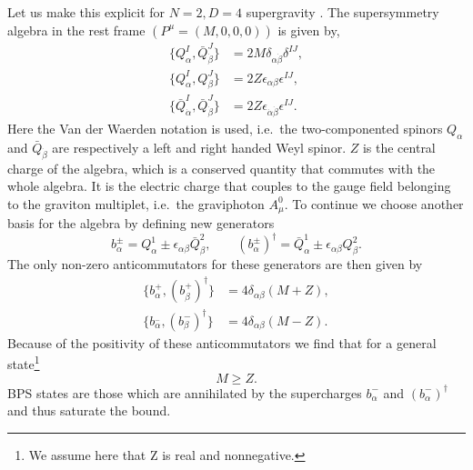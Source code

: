 \documentclass[12pt,twoside]{book}
\begin{document}
Let us make this explicit for $N=2, D=4$ supergravity \cite{string-bbs}. The supersymmetry algebra in the rest frame $( P^{\mu} = (M,0,0,0) )$ is given by,
\begin{equation}\label{N2D4-restAlg}
\begin{split}
\{ Q_{\alpha}^{I}, \bar{Q}_{\dot{\beta}}^{J} \} & = 2M\delta_{\alpha\dot{\beta}} \delta^{IJ},\\
\{ Q_{\alpha}^{I}, Q_{\beta}^{J} \} & = 2Z\epsilon_{\alpha\beta} \epsilon^{IJ},\\
\{ \bar{Q}_{\dot{\alpha}}^{I}, \bar{Q}_{\dot{\beta}}^{J} \}& = 2Z\epsilon_{\dot{\alpha}\dot{\beta}} \epsilon^{IJ}.
\end{split}
\end{equation}
Here the Van der Waerden notation is used, i.e.\ the two-componented spinors $Q_{\alpha}$ and $\bar{Q}_{\dot{\beta}}$ are respectively a left and right handed Weyl spinor. $Z$ is the central charge of the algebra, which is a conserved quantity that commutes with the whole algebra. It is the electric charge that couples to the gauge field belonging to the graviton multiplet, i.e.\ the graviphoton $A_{\mu}^{0}$.
To continue we choose another basis for the algebra by defining new generators
\begin{equation}
b_{\alpha}^{\pm} = Q_{\alpha}^{1} \pm \epsilon_{\alpha\beta} \bar{Q}_{\beta}^{2}, \qquad
\left( b_{\alpha}^{\pm} \right)^{\dagger} = \bar{Q}_{\alpha}^{1} \pm \epsilon_{\alpha\beta} Q_{\beta}^{2}.
\end{equation}
The only non-zero anticommutators for these generators are then given by
\begin{equation}
\begin{split}
\{ b_{\alpha}^{+}, \left( b_{\beta}^{+}\right)^{\dagger} \} &= 4\delta_{\alpha\beta}(M + Z), \\
\{ b_{\alpha}^{_{-}}, \left( b_{\beta}^{-}\right)^{\dagger} \} &= 4\delta_{\alpha\beta}(M - Z).
\end{split}
\end{equation}
Because of the positivity of these anticommutators we find that for a general state\footnote{
We assume here that Z is real and nonnegative.
}
\begin{equation}\label{BPS-bound}
M \geq Z.
\end{equation}
BPS states are those which are annihilated by the supercharges $b_{\alpha}^{-}$ and $(b_{\alpha}^{-})^{\dagger}$ and thus saturate the bound.
\end{document}
